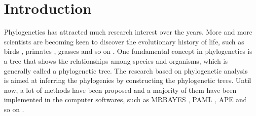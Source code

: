 \documentclass{bmcart}
\begin{document}
\begin{frontmatter}
\begin{abstractbox}
\begin{keyword}
\end{keyword}


\end{abstractbox}
%

\end{frontmatter}



\section*{Introduction}
Phylogenetics has attracted much research interest over the years. More and more scientists are becoming keen to discover the evolutionary history of life, such as birds \cite{hackett2008phylogenomic}, primates \cite{szalay2013evolutionary}, grasses \cite{kellogg2001evolutionary} and so on \cite{sawabe2007inferring,garnery1992evolutionary}. One fundamental concept in phylogenetics is a tree that shows the relationships among species and organisms, which is generally called a phylogenetic tree. The research based on phylogenetic analysis is aimed at inferring the phylogenies by constructing the phylogenetic trees. Until now, a lot of methods have been proposed and a majority of them have been implemented in the computer softwares, such as MRBAYES \cite{huelsenbeck2001mrbayes}, PAML \cite{yang1997paml}, APE \cite{paradis2004ape} and so on \cite{kumar2016mega7}. 
\end{document}
